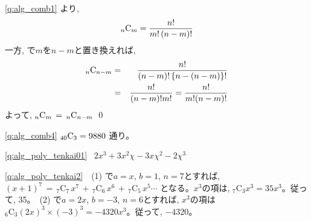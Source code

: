 \ref{q:alg_comb1} 
より, 
\begin{eqnarray*}
_n{\text C}_m = \frac{n!}{m!\,(n-m)!}
\end{eqnarray*}
一方, で$m$を$n-m$と置き換えれば, 
\begin{eqnarray*}
_n{\text C}_{n-m} & = & \frac{n!}{(n-m)!\,\{n-(n-m)\}!}\\
                  & = & \frac{n!}{(n-m)!m!} = \frac{n!}{m!(n-m)!}
\end{eqnarray*}
よって, $_n{\text C}_m\,=\,_n{\text C}_{n-m}$ \qed
\mv

\ref{q:alg_comb4} $_{40}{\text C}_3 = 9880$ 通り。
\mv

\ref{q:alg_poly_tenkai01} $\,\,\,2x^3+3x^2\chi-3x\chi^2-2\chi^3$
\mv

\ref{q:alg_poly_tenkai2}　(1) で$a=x$, $b=1$, $n=7$とすれば, 
$(x+1)^7\,=\,_7\text{C}_7\,x^7\,+\,_7\text{C}_6\,x^6\,+\,_7\text{C}_5\,x^5\cdots$
となる。$x^3$の項は, $_7\text{C}_3x^3=35x^3$。従って, 35。　(2) で$a=2x$, $b=-3$, $n=6$とすれば, $x^3$の項は
$_6\text{C}_3(2x)^3\times(-3)^3=-4320x^3$。従って, $-4320$。\mv

